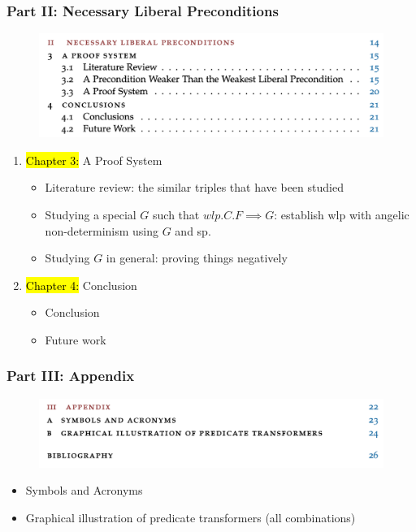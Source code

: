 \documentclass[aspectratio=169]{beamer}
\begin{document}
\begin{frame}[fragile]
	\frametitle{Part II: Necessary Liberal Preconditions}
	\begin{minipage}[t]{0.49\linewidth}	
		\begin{figure}
		\centering \includegraphics[width=1.1\textwidth]{images/part2.png} 
	  \end{figure}
	\end{minipage}
	\begin{minipage}[t]{0.5\linewidth}
		\begin{enumerate}
				\item[] \hl{Chapter 3: }A Proof System
				\begin{itemize}
					\item Literature review: the similar triples that have been studied 
					\item Studying a special $G$ such that $wlp.C.F \implies G$: establish wlp with angelic non-determinism using $G$ and sp. 
					\item Studying $G$ in general: proving things negatively
				\end{itemize}
			\item[] \hl{Chapter 4: }Conclusion
				\begin{itemize}
					\item Conclusion 
					\item Future work
				\end{itemize}
	\end{enumerate}
	\end{minipage}
	
\end{frame}
\begin{frame}[fragile]
	\frametitle{Part III: Appendix}
	\begin{minipage}[t]{0.49\linewidth}	
		\begin{figure}
			\centering \includegraphics[width=\textwidth]{images/part3.png} 
		\end{figure}
	\end{minipage}
	\begin{minipage}[t]{0.49\linewidth}
		\begin{itemize}
			\item Symbols and Acronyms
			\item Graphical illustration of predicate transformers (all combinations)
		\end{itemize}
	\end{minipage}
\end{frame}
\end{document}
